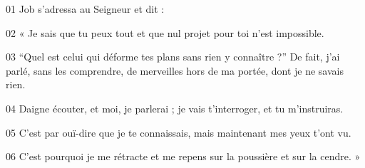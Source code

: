 01 Job s’adressa au Seigneur et dit :

02 « Je sais que tu peux tout et que nul projet pour toi n’est impossible.

03 “Quel est celui qui déforme tes plans sans rien y connaître ?” De fait, j’ai parlé, sans les comprendre, de merveilles hors de ma portée, dont je ne savais rien.

04 Daigne écouter, et moi, je parlerai ; je vais t’interroger, et tu m’instruiras.

05 C’est par ouï-dire que je te connaissais, mais maintenant mes yeux t’ont vu.

06 C’est pourquoi je me rétracte et me repens sur la poussière et sur la cendre. »